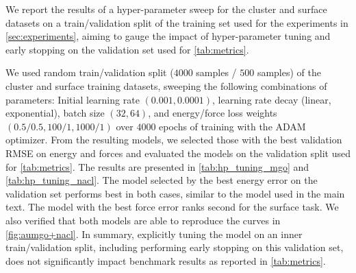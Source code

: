 \documentclass[10pt]{article} %
\begin{document}
We report the results of a hyper-parameter sweep for  the  cluster and  surface datasets on a  train/validation split of the training set used for the experiments in \cref{sec:experiments}, aiming to gauge the impact of hyper-parameter tuning and early stopping on the validation set used for \cref{tab:metrics}.

We used random train/validation split ($4000$ samples / $500$ samples) of the  cluster and  surface training datasets, sweeping the following combinations of parameters: Initial learning rate $(0.001, 0.0001)$, learning rate decay (linear, exponential), batch size $(32, 64)$, and energy/force loss weights $(0.5/0.5, 100/1, 1000/1)$ over $4000$ epochs of training with the ADAM optimizer.
From the resulting models, we selected those with the best  validation RMSE on energy and forces and evaluated the models on the  validation split used for \cref{tab:metrics}.
The results  are presented in \cref{tab:hp_tuning_mgo} and \cref{tab:hp_tuning_nacl}.
The model selected by the best energy error on the validation set performs best in both cases, similar to the model used in the main text. The model with the best force error ranks second for the  surface task. We also verified that both models are able to reproduce the curves in \cref{fig:aumgo+nacl}.
In summary, explicitly tuning the model on an inner train/validation split, including performing early stopping on this validation set, does not significantly impact benchmark results as reported in \cref{tab:metrics}.

\begin{table}[h]
    \caption{Errors on the validation set for the hyperparameter set with the best inner validation metrics for the  task.}
    \centering
    
    \label{tab:hp_tuning_mgo}
\end{table}

\begin{table}[h]
    \caption{Errors on the validation set for the hyperparameter set with the best inner validation metrics for the  task.}
    \centering
    
    \label{tab:hp_tuning_nacl}
\end{table}
\end{document}

